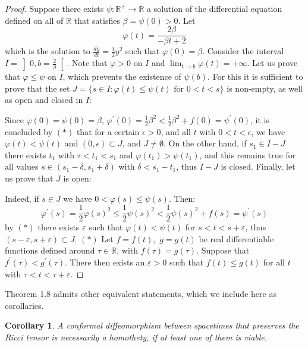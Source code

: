 \documentclass{amsart}%
\theoremstyle{plain}
\newtheorem{corollary}{Corollary}
\numberwithin{equation}{section}
\begin{document}
\begin{proof}
Suppose there exists $\psi:\mathbb{R}^{+}\longrightarrow\mathbb{R}$ a solution
of the differential equation defined on all of $\mathbb{R}$ that satisfies
$\beta=\psi(0)>0$. Let
\[
\varphi(t)=\frac{2\beta}{-\beta t+2}
\]
which is the solution to $\frac{dy}{dt}=\frac{1}{2}y^{2}$ such that
$\varphi(0)=\beta$. Consider the interval $I=\left]  0,b=\frac{2}{\beta
}\right[  $. Note that $\varphi>0$ on $I$ and $\lim_{t\rightarrow b}
\varphi(t)=+\infty$. Let us prove that $\varphi\leq\psi$ on $I$, which
prevents the existence of $\psi(b)$. For this it is sufficient to prove that
the set $J=\{s\in I:\varphi(t)\leq\psi(t)\text{ for }0<t<s\}$ is non-empty, as
well as open and closed in $I$:

Since $\varphi(0)=\psi(0)=\beta$, $\varphi^{\prime}(0)=\frac{1}{2}\beta
^{2}<\frac{1}{2}\beta^{2}+f(0)=\psi^{\prime}(0)$, it is concluded by $(\ast)$
that for a certain $\epsilon>0$, and all $t$ with $0<t<\epsilon$, we have
$\varphi(t)<\psi(t)$ and $(0,\epsilon)\subset J$, and $J\neq\emptyset$. On the
other hand, if $s_{1}\in I-J$ there exists $t_{1}$ with $\tau<t_{1}<s_{1}$ and
$\varphi(t_{1} )>\psi(t_{1})$, and this remains true for all values
$s\in(s_{1}-\delta,s_{1}+\delta)$ with $\delta<s_{1}-t_{1}$, thus $I-J$ is
closed. Finally, let us prove that $J$ is open:

Indeed, if $s\in J$ we have $0<\varphi(s)\leq\psi(s)$. Then:
\[
\varphi^{\prime}(s)=\frac{1}{2}\varphi(s)^{2}\leq\frac{1}{2}\psi(s)^{2}%
<\frac{1}{2}\psi(s)^{2}+f(s)=\psi^{\prime}(s)
\]
by $(\ast)$ there exists $\varepsilon$ such that $\varphi(t)<\psi(t)$ for
$s<t<s+\varepsilon$, thus $(s-\varepsilon,s+\varepsilon)\subset J$. $(\ast)$
Let $f=f\left(  t\right)  ,$ $g=g\left(  t\right)  $ be real differentiable
functions defined around $\tau\in\mathbb{R}$, with $f\left(  \tau\right)
=g\left(  \tau\right)  $. Suppose that $f^{\prime}\left(  \tau\right)
<g^{\prime}\left(  \tau\right)  $. There then exists an $\varepsilon>0$ such
that $f\left(  t\right)  \leq g\left(  t\right)  $ for all $t$ with
$\tau<t<\tau+\varepsilon$.
\end{proof}

Theorem 1.8 admits other equivalent statements, which we include here as corollaries.

\begin{corollary}
A conformal diffeomorphism between spacetimes that preserves the Ricci tensor
is necessarily a homothety, if at least one of them is viable.
\end{corollary}
\end{document}
